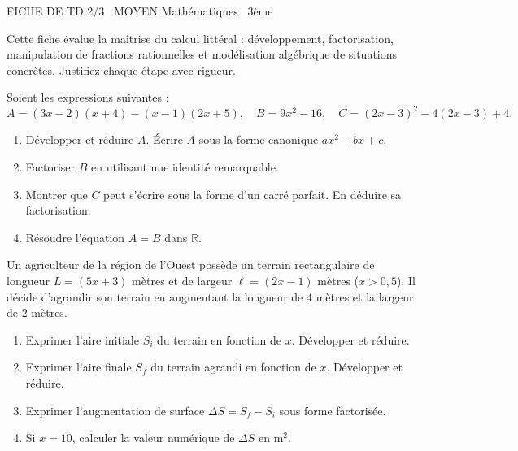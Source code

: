 \documentclass[11pt]{article}
\begin{document}
\begin{tcolorbox}[enhanced,colback=popink,colframe=popink,arc=10pt,boxrule=0pt,left=12pt,right=12pt,top=9pt,bottom=9pt]
{\color{white}\popxbold\small FICHE DE TD 2/3 \textbullet\ MOYEN \hfill Mathématiques \textbullet\ 3ème\par}
\end{tcolorbox}
\vspace{4pt}
Cette fiche évalue la maîtrise du calcul littéral : développement, factorisation, manipulation de fractions rationnelles et modélisation algébrique de situations concrètes. Justifiez chaque étape avec rigueur.

\begin{exercice}
Soient les expressions suivantes :
\[
A = (3x - 2)(x + 4) - (x - 1)(2x + 5), \quad 
B = 9x^2 - 16, \quad 
C = (2x - 3)^2 - 4(2x - 3) + 4.
\]
\begin{enumerate}
    \item Développer et réduire $A$. Écrire $A$ sous la forme canonique $ax^2 + bx + c$.
    \item Factoriser $B$ en utilisant une identité remarquable.
    \item Montrer que $C$ peut s'écrire sous la forme d'un carré parfait. En déduire sa factorisation.
    \item Résoudre l'équation $A = B$ dans $\mathbb{R}$.
\end{enumerate}
\end{exercice}

\begin{exercice}
Un agriculteur de la région de l'Ouest possède un terrain rectangulaire de longueur $L = (5x + 3)$ mètres et de largeur $\ell = (2x - 1)$ mètres ($x > 0,5$). Il décide d'agrandir son terrain en augmentant la longueur de $4$ mètres et la largeur de $2$ mètres.
\begin{enumerate}
    \item Exprimer l'aire initiale $S_i$ du terrain en fonction de $x$. Développer et réduire.
    \item Exprimer l'aire finale $S_f$ du terrain agrandi en fonction de $x$. Développer et réduire.
    \item Exprimer l'augmentation de surface $\Delta S = S_f - S_i$ sous forme factorisée.
    \item Si $x = 10$, calculer la valeur numérique de $\Delta S$ en $\text{m}^2$.
\end{enumerate}
\end{exercice}
\end{document}
